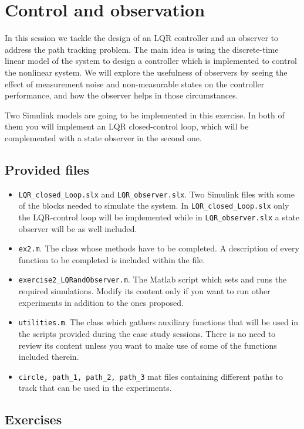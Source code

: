 \setcounter{chapter}{1}
\chapter{Control and observation}
In this session we tackle the design of an LQR controller and an observer to address the path tracking problem.
The main idea is using the discrete-time linear model of the system to design a controller which is implemented to control the nonlinear system. 
We will explore the usefulness of observers by seeing the effect of measurement noise and non-measurable states on the controller performance, and how the observer helps in those circumstances.\par
%
Two Simulink models are going to be implemented in this exercise. 
In both of them you will implement an LQR closed-control loop, which will be complemented with a state observer in the second one.
\section{Provided files}
\begin{itemize}
	\setlength\itemsep{0em}
	\item \texttt{LQR\_closed\_Loop.slx} and \texttt{LQR\_observer.slx}.
		Two Simulink files with some of the blocks needed to simulate the system.
		In \texttt{LQR\_closed\_Loop.slx} only the LQR-control loop will be implemented while in \texttt{LQR\_observer.slx} a state observer will be as well included. 
	\item \texttt{ex2.m}.
		The class whose methods have to be completed.
		A description of every function to be completed is included within the file.
	\item \texttt{exercise2\_LQRandObserver.m}.
		The Matlab script which sets and runs the required simulations.
		Modify its content only if you want to run other experiments in addition to the ones proposed.
	\item \texttt{utilities.m}.
		The class which gathers auxiliary functions that will be used in the scripts provided during the case study sessions.
		There is no need to review its content unless you want to make use of some of the functions included therein.
	\item \texttt{circle, path\_1, path\_2, path\_3} mat files containing different paths to track that can be used in the experiments.
\end{itemize}
%
\section{Exercises}
